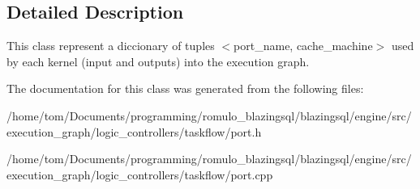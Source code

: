 \subsection{Detailed Description}
This class represent a diccionary of tuples $<$port\+\_\+name, cache\+\_\+machine$>$ used by each kernel (input and outputs) into the execution graph. 

The documentation for this class was generated from the following files\+:\begin{DoxyCompactItemize}
\item 
/home/tom/\+Documents/programming/romulo\+\_\+blazingsql/blazingsql/engine/src/execution\+\_\+graph/logic\+\_\+controllers/taskflow/port.\+h\item 
/home/tom/\+Documents/programming/romulo\+\_\+blazingsql/blazingsql/engine/src/execution\+\_\+graph/logic\+\_\+controllers/taskflow/port.\+cpp\end{DoxyCompactItemize}
